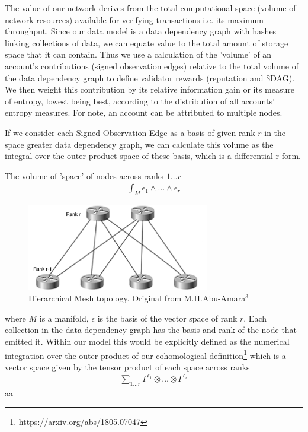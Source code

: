 \documentclass{article}
\begin{document}
The value of our network derives from the total computational space (volume of network resources) available for verifying transactions i.e. its maximum throughput. Since our data model is a data dependency graph with hashes linking collections of data, we can equate value to the total amount of storage space that it can contain. Thus we use a calculation of the 'volume' of an account's contributions (signed observation edges) relative to the total volume of the data dependency graph to define validator rewards (reputation and \$DAG). We then weight this contribution by its relative information gain or its measure of entropy, lowest being best, according to the distribution of all accounts' entropy measures. For note, an account can be attributed to multiple nodes.

If we consider each Signed Observation Edge as a basis of given rank $r$ in the space greater data dependency graph, we can calculate this volume as the integral over the outer product space of these basis, which is a differential r-form.

The volume of 'space' of nodes across ranks $1 \dots r$
\begin{equation*} \label{eq1}
\begin{split}
\int_M \epsilon_1 \wedge \dots \wedge \epsilon_r
\end{split}
\end{equation*}

\begin{figure}[h]
\caption{Hierarchical Mesh topology. Original from M.H.Abu-Amara$^3$}%
\includegraphics[width=8cm]{Designing_a_network_topology-M_H_Abu-Amara}
\centering
\end{figure}

where $M$ is a manifold, $\epsilon$ is the basis of the vector space of rank $r$. Each collection in the data dependency graph has the basis and rank of the node that emitted it. Within our model this would be explicitly defined as the numerical integration over the outer product of our cohomological definition\footnote{https://arxiv.org/abs/1805.07047} which is a vector space given by the tensor product of each space across ranks
\begin{equation*} \label{eq1}
\begin{split}
\sum_{1 \dots r} \Gamma^{\epsilon_1} \otimes \dots \otimes \Gamma^{\epsilon_r}
\end{split}
\end{equation*}aa
\end{document}
